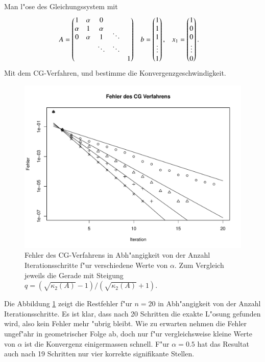 \begin{beispiel}
Man l"ose des Gleichungssystem mit 
\begin{align*}
A&=\begin{pmatrix}
     1&\alpha&     0&      &      \\
\alpha&     1&\alpha&      &      \\
     0&\alpha&     1&\smash{\ddots}&      \\
      &      &\ddots&\ddots&      \\
      &      &      &      &     1
\end{pmatrix}
&
b&=\begin{pmatrix}1\\1\\1\\\vdots\\1\end{pmatrix},
&
x_1&=\begin{pmatrix}1\\0\\0\\\vdots\\0\end{pmatrix}.
\end{align*}
Mit dem CG-Verfahren, und bestimme die Konvergenzgeschwindigkeit.

\begin{figure}
\begin{center}
\includegraphics[width=\hsize]{graphics/cgresults.pdf}
\end{center}
\caption{Fehler des CG-Verfahrens in Abh"angigkeit von der Anzahl
Iterationsschritte f"ur verschiedene Werte von $\alpha$.
Zum Vergleich jeweils die Gerade mit Steigung
$q=(\sqrt{\kappa_2(A)}-1)/(\sqrt{\kappa_2(A)}+1)$.
\label{cg:example}}
\end{figure}
Die Abbildung \ref{cg:example} zeigt die Restfehler f"ur $n=20$
in Abh"angigkeit von der Anzahl Iterationsschritte.
Es ist klar, dass nach 20 Schritten die exakte L"osung gefunden wird, also
kein Fehler mehr "ubrig bleibt.
Wie zu erwarten nehmen die Fehler ungef"ahr in geometrischer Folge ab,
doch nur f"ur vergleichsweise kleine Werte von $\alpha$ ist die Konvergenz
einigermassen schnell.
F"ur $\alpha = 0.5$ hat das Resultat auch nach 19 Schritten nur vier
korrekte signifikante Stellen.
\end{beispiel}

